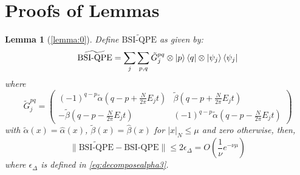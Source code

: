 \documentclass[aps,floatfix,10pt,amssymb,amsfont,amsmath,superscriptaddress,float,nofootinbib,longbibliography,nobalancelastpage,twocolumn]{revtex4-2}
\newtheorem*{lemma*}{Lemma}
\begin{document}
\section{Proofs of Lemmas}
\label{section:appendixTrunc}
\begin{lemma*}[\ref{lemma:0}]
    Define $\widetilde{\text{BSI-QPE}}$ as given by:
    \begin{equation}
       \widetilde{\text{BSI-QPE}}=\sum_j \sum_{p,q} \tilde G^{pq}_j \otimes \ket{p}\bra{q} \otimes \ket{\psi_j}\bra{\psi_j}
    \end{equation}
    where 
    \begin{equation}
        \tilde G^{pq}_j = \begin{pmatrix}
        (-1)^{q-p}\tilde\alpha(q-p+\frac{N}{2\pi}E_jt) & \tilde\beta(q-p+\frac{N}{2\pi}E_jt)\\
        -\tilde\beta (q-p-\frac{N}{2\pi}E_jt) & (-1)^{q-p}\tilde\alpha(q-p-\frac{N}{2\pi}E_jt)
    \end{pmatrix}
    \end{equation}
    with $\tilde\alpha(x)=\hat\alpha(x)$, $\tilde\beta(x)=\hat\beta(x)$ for $|x|_{N}\leq\mu$ and zero otherwise, then,  
    \begin{equation}
        \|\widetilde{\text{BSI-QPE}}-\text{BSI-QPE}\| \leq 2\epsilon_{\Delta}= O\left(\frac{1}{\nu}e^{-\nu \mu}\right)
    \end{equation}
    where $\epsilon_{\Delta}$ is defined in \eqref{eq:decomposealpha3}.
\end{lemma*}
\end{document}
